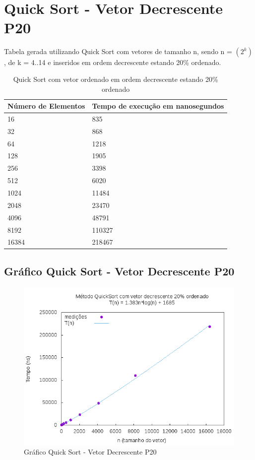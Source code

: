 \documentclass[12pt,a4paper,twoside]{report}
\begin{document}
\section{Quick Sort - Vetor Decrescente P20}
Tabela gerada utilizando Quick Sort com vetores de tamanho n, sendo n = $(2^k)$, de k = 4..14 e inseridos em ordem decrescente estando 20\% ordenado.
\begin{table}[H]
\centering
\caption{Quick Sort com vetor ordenado em ordem decrescente estando 20\% ordenado}
\label{my-label}
\begin{tabular}{|l|l|}
\hline
\multicolumn{1}{|c|}{\textbf{Número de Elementos}} & \multicolumn{1}{c|}{\textbf{Tempo de execução em nanosegundos}} \\ \hline
16 & 835 \\ \hline
32 & 868 \\ \hline
64 & 1218 \\ \hline
128 & 1905 \\ \hline
256 & 3398 \\ \hline
512 & 6020 \\ \hline
1024 & 11484 \\ \hline
2048 & 23470 \\ \hline
4096 & 48791 \\ \hline
8192 & 110327 \\ \hline
16384 & 218467 \\ \hline
\end{tabular}
\end{table}

\subsection{Gráfico Quick Sort - Vetor Decrescente P20}
\begin{figure}[H]
    \centering
    \includegraphics[width=0.7\linewidth]{graficos/QuickSort/vIntDecrescenteP20/vIntDecrescenteP20.png}
  \caption{Gráfico Quick Sort - Vetor Decrescente P20}
\end{figure}
\end{document}
